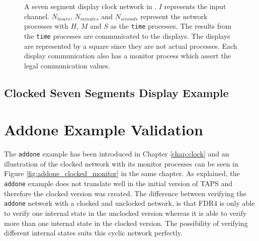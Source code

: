 \begin{figure}[!ht]
  \caption{A seven segment display clock network in \cspm{}. $I$ represents the input channel. $N_{hours}$, $N_{minutes}$ and $N_{seconds}$ represent the network processes with $H$, $M$ and $S$ as the \texttt{time} processes. The results from the \texttt{time} processes are communicated to the displays. The displays are represented by a square since they are not actual \cspm{} processes. Each display communication also has a monitor process which assert the legal communication values.}
  \label{fig:cspm-network}
\end{figure}
\subsection{Clocked Seven Segments Display Example}



\section{Addone Example Validation}
The \texttt{addone} example has been introduced in Chapter \ref{chap:clock} and an illustration of the clocked network with its monitor processes can be seen in Figure \ref{fig:addone_clocked_monitor} in the same chapter. As explained, the \texttt{addone} example does not translate well in the initial version of TAPS and therefore the clocked version was created.
The difference between verifying the \texttt{addone} network with a clocked and unclocked network, is that FDR4 is only able to verify one internal state in the unclocked version whereas it is able to verify more than one internal state in the clocked version. The possibility of verifying different internal states suits this cyclic network perfectly.\\


